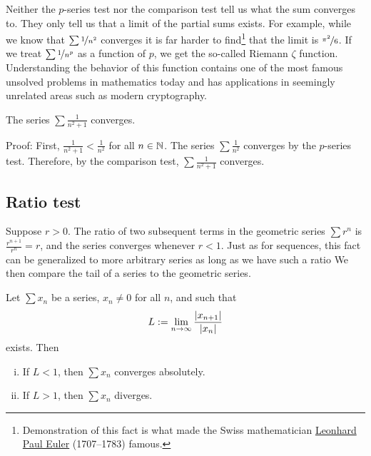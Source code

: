 Neither the $p$-series test nor the comparison test 
tell us what the sum converges to.  They only tell us that a limit
of the partial sums exists.  For example, while we know that
$\sum \nicefrac{1}{n^2}$ converges it is far harder to
find\footnote{Demonstration of this fact is
what made the Swiss mathematician
\href{https://en.wikipedia.org/wiki/Leonhard_Euler}{Leonhard Paul Euler}
(1707--1783)
famous.}
that the limit is $\nicefrac{\pi^2}{6}$.
If we treat $\sum \nicefrac{1}{n^p}$ as a function of $p$,
we get the so-called Riemann $\zeta$ function.  Understanding the
behavior of this function contains
one of the most famous unsolved problems in mathematics today and has applications
in seemingly unrelated areas such as modern cryptography.

\begin{example}
The series $\sum \frac{1}{n^2+1}$ converges.

Proof:  First, $\frac{1}{n^2+1} < \frac{1}{n^2}$ for all $n \in {\mathbb{N}}$.
The series $\sum \frac{1}{n^2}$ converges by the $p$-series test.
Therefore, by the comparison test, $\sum \frac{1}{n^2+1}$ converges.
\end{example}

\subsection{Ratio test}

Suppose $r > 0$.  The ratio of two subsequent terms in the geometric series $\sum
r^n$ is $\frac{r^{n+1}}{r^n} = r$, and the series converges
whenever $r < 1$.  Just as for sequences, this fact
can be generalized to more arbitrary series
as long as we have such a ratio   We then compare
the tail of a series to the geometric series.


\begin{prop}
Let $\sum x_n$ be a series, $x_n \not= 0$ for all $n$, and such that
\begin{equation*}
L := \lim_{n\to\infty} \frac{\left\lvert {x_{n+1}} \right\rvert}{\left\lvert {x_n} \right\rvert}
\end{equation*}
exists.  Then
\begin{enumerate}[(i)]
\item
If $L < 1$, then $\sum x_n$ converges absolutely.
\item
If $L > 1$, then $\sum x_n$ diverges.
\end{enumerate}
\end{prop}

